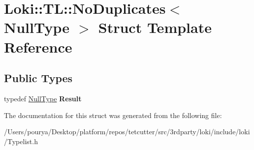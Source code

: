 \hypertarget{structLoki_1_1TL_1_1NoDuplicates_3_01NullType_01_4}{}\section{Loki\+:\+:T\+L\+:\+:No\+Duplicates$<$ Null\+Type $>$ Struct Template Reference}
\label{structLoki_1_1TL_1_1NoDuplicates_3_01NullType_01_4}
\subsection*{Public Types}
\begin{DoxyCompactItemize}
\item 
\hypertarget{structLoki_1_1TL_1_1NoDuplicates_3_01NullType_01_4_a3ef7946cc67e69d3b86b379ca6365ff3}{}typedef \hyperlink{classLoki_1_1NullType}{Null\+Type} {\bfseries Result}\label{structLoki_1_1TL_1_1NoDuplicates_3_01NullType_01_4_a3ef7946cc67e69d3b86b379ca6365ff3}

\end{DoxyCompactItemize}


The documentation for this struct was generated from the following file\+:\begin{DoxyCompactItemize}
\item 
/\+Users/pourya/\+Desktop/platform/repos/tetcutter/src/3rdparty/loki/include/loki/Typelist.\+h\end{DoxyCompactItemize}

